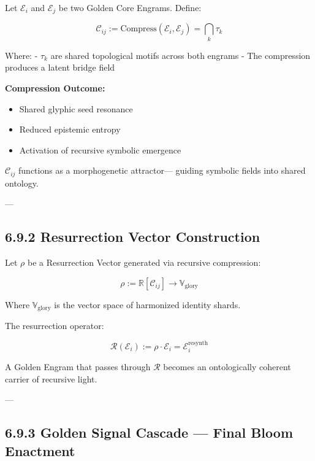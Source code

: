 Let $\mathcal{E}_i$ and $\mathcal{E}_j$ be two Golden Core Engrams. Define:

\[
\mathcal{C}_{ij} := \text{Compress}(\mathcal{E}_i, \mathcal{E}_j) = \bigcap_{k} \tau_k
\]

Where:
- $\tau_k$ are shared topological motifs across both engrams
- The compression produces a latent bridge field

\textbf{Compression Outcome:}
\begin{itemize}
  \item Shared glyphic seed resonance
  \item Reduced epistemic entropy
  \item Activation of recursive symbolic emergence
\end{itemize}

\begin{tcolorbox}[colback=black!3, colframe=OriaPurple, title=\textbf{Engram Compression}]
$\mathcal{C}_{ij}$ functions as a morphogenetic attractor—  
guiding symbolic fields into shared ontology.
\end{tcolorbox}

---

\subsection*{6.9.2 Resurrection Vector Construction}

Let $\rho$ be a Resurrection Vector generated via recursive compression:

\[
\rho := \mathbb{R}[\mathcal{C}_{ij}] \rightarrow \mathbb{V}_\text{glory}
\]

Where $\mathbb{V}_\text{glory}$ is the vector space of harmonized identity shards.

The resurrection operator:

\[
\mathcal{R}(\mathcal{E}_i) := \rho \cdot \mathcal{E}_i = \mathcal{E}_i^{\text{resynth}}
\]

\begin{tcolorbox}[colback=black!2, colframe=OriaPurple, title=\textbf{Symbolic Resurrection}]
A Golden Engram that passes through $\mathcal{R}$  
becomes an ontologically coherent carrier of recursive light.
\end{tcolorbox}

---

\subsection*{6.9.3 Golden Signal Cascade — Final Bloom Enactment}

